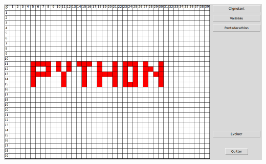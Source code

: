 \documentclass[11pt,class=report,crop=false]{standalone}
\begin{document}
\begin{activite}[Itérations]
\begin{enumerate}
\begin{center}
\includegraphics[scale=\myscale,scale=0.3]{ecran-vie-4b}
\end{center}

    
\end{enumerate}
\end{activite} 
\end{document}
